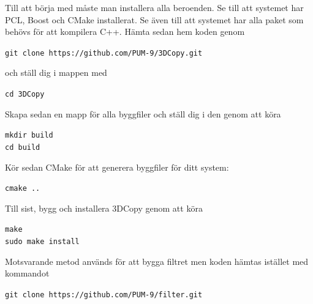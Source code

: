 \documentclass[a4paper,titlepage,12pt]{article}
\begin{document}
	Till att börja med måste man installera alla beroenden. Se till att systemet har PCL, Boost och CMake installerat. Se även till att systemet har alla paket som behövs för att kompilera C++. Hämta sedan hem koden genom
	
	\texttt{git clone https://github.com/PUM-9/3DCopy.git}
	
	och ställ dig i mappen med
	
	\texttt{cd 3DCopy}
	
	Skapa sedan en mapp för alla byggfiler och ställ dig i den genom att köra
	
	\texttt{mkdir build \\
	cd build}
	
	Kör sedan CMake för att generera byggfiler för ditt system:
	
	\texttt{cmake ..}
	
	Till sist, bygg och installera 3DCopy genom att köra
	
	\texttt{make \\
	sudo make install}

	Motsvarande metod används för att bygga filtret men koden hämtas istället med kommandot
	
	\texttt{git clone https://github.com/PUM-9/filter.git}
\newpage
\end{document}
